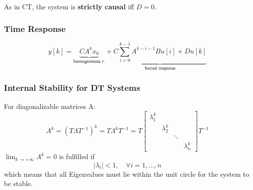 As in CT, the system is \textbf{strictly causal} iff $D=0$.

\subsubsection{Time Response}
\noindent\begin{equation*}
    y[k]=\underbrace{CA^{k}x_0}_{\textsf{homogeneous r.}} + \underbrace{C\sum_{i=0}^{k-1}A^{k-i-1}Bu[i]+Du[k]}_{\textsf{forced response}}
\end{equation*}

\subsubsection{Internal Stability for DT Systems}

For diagonalizable matrices A:
\begin{equation*}
    A^k ={(T\Lambda T^{-1})}^k=T\Lambda^{k}T^{-1}=T
    \begin{bmatrix}
        \lambda_1^k &             &        &             \\
                    & \lambda_2^k &        &             \\
                    &             & \ddots &             \\
                    &             &        & \lambda_n^k
    \end{bmatrix}T^{-1}
\end{equation*}
$\lim_{k\to+\infty}A^k=0$ is fulfilled if
\begin{equation*}
    |\lambda_i| <1,\quad\forall i=1,\ldots,n
\end{equation*}
which means that all Eigenvalues must lie within the unit circle for the system to be stable.

